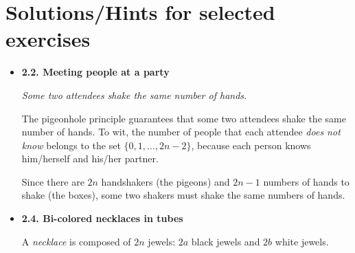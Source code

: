 
\chapter{Solutions/Hints for selected exercises}
\label{ch:Exercises}




\begin{itemize}
\item
{\bf 2.2. Meeting people at a party}

{\em Some two attendees shake the same number of hands.}
\medskip

The pigeonhole principle guarantees that some two attendees shake the same
number of hands.  To wit, the number of people that each attendee {\em
  does not know} belongs to the set $\{ 0, 1, \ldots, 2n-2 \}$,
because each person knows him/herself and his/her partner.  

Since there are $2n$ handshakers (the pigeons) and $2n-1$ numbers of hands
to shake (the boxes), some two shakers must shake the same numbers of
hands. 
\medskip
\item
{\bf 2.4. Bi-colored necklaces in tubes}

A {\it necklace} is composed of $2n$ jewels: $2a$ black jewels and $2b$ white jewels. 
\smallskip


\end{itemize}
